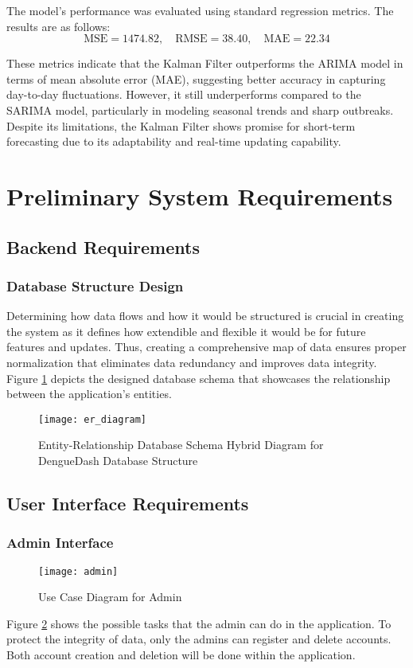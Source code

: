 The model’s performance was evaluated using standard regression metrics. The results are as follows:
\[
\text{MSE} = 1474.82, \quad
\text{RMSE} = 38.40, \quad
\text{MAE} = 22.34
\]

These metrics indicate that the Kalman Filter outperforms the ARIMA model in terms of mean absolute error (MAE), suggesting better accuracy in capturing day-to-day fluctuations. However, it still underperforms compared to the SARIMA model, particularly in modeling seasonal trends and sharp outbreaks. Despite its limitations, the Kalman Filter shows promise for short-term forecasting due to its adaptability and real-time updating capability.


\clearpage
\section{Preliminary System Requirements}
\subsection{Backend Requirements}
\subsubsection{Database Structure Design}
Determining how data flows and how it would be structured is crucial in creating the system as it defines how extendible and flexible it would be for future features and updates. Thus, creating a comprehensive map of data ensures proper normalization that eliminates data redundancy and improves data integrity. Figure \ref{fig:er_diagram} depicts the designed database schema that showcases the relationship between the application's entities. 
\begin{figure}[H]
	\centering
	\texttt{[image: er\_diagram]}
	\caption{Entity-Relationship Database Schema Hybrid Diagram for DengueDash Database Structure}
	\label{fig:er_diagram}
\end{figure}

\subsection{User Interface Requirements}
\subsubsection{Admin Interface}
\begin{figure}[H]
	\centering
	\texttt{[image: admin]}
	\caption{Use Case Diagram for Admin}
	\label{fig:admin-use-case}
\end{figure}
Figure \ref{fig:admin-use-case} shows the possible tasks that the admin can do in the application. To protect the integrity of data, only the admins can register and delete accounts. Both account creation and deletion will be done within the application.

